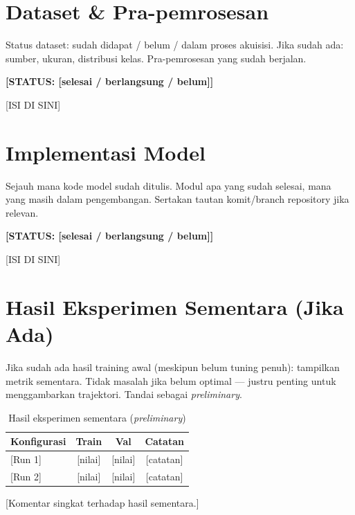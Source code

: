 \documentclass[11pt,a4paper,oneside]{report}
\newcommand{\statusbox}[1]{\textbf{[STATUS: #1]}}
\begin{document}
\section{Dataset \& Pra-pemrosesan}
\begin{petunjuk}
Status dataset: sudah didapat / belum / dalam proses akuisisi. Jika sudah ada: sumber, ukuran, distribusi kelas. Pra-pemrosesan yang sudah berjalan.
\end{petunjuk}

\statusbox{[selesai / berlangsung / belum]}

[ISI DI SINI]

\section{Implementasi Model}
\begin{petunjuk}
Sejauh mana kode model sudah ditulis. Modul apa yang sudah selesai, mana yang masih dalam pengembangan. Sertakan tautan komit/branch repository jika relevan.
\end{petunjuk}

\statusbox{[selesai / berlangsung / belum]}

[ISI DI SINI]

\section{Hasil Eksperimen Sementara (Jika Ada)}
\begin{petunjuk}
Jika sudah ada hasil training awal (meskipun belum tuning penuh): tampilkan metrik sementara. Tidak masalah jika belum optimal --- justru penting untuk menggambarkan trajektori. Tandai sebagai \textit{preliminary}.
\end{petunjuk}

\begin{table}[h!]
\centering
\caption{Hasil eksperimen sementara (\textit{preliminary})}
\label{tab:hasil-sementara}
\begin{tabular}{lccc}
\toprule
\textbf{Konfigurasi} & \textbf{Train} & \textbf{Val} & \textbf{Catatan} \\
\midrule
{[Run 1]} & [nilai] & [nilai] & [catatan] \\
{[Run 2]} & [nilai] & [nilai] & [catatan] \\
\bottomrule
\end{tabular}
\end{table}

[Komentar singkat terhadap hasil sementara.]
\end{document}
